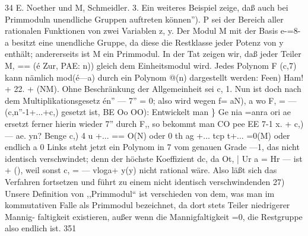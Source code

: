\documentclass[11pt,a4paper]{article}
\theoremstyle{plain}
\theoremstyle{definition}
\begin{document}
34 
E. Noether und M, Schmeidler. 
3. Ein weiteres Beispiel zeige, daß auch bei Primmoduln unendliche 
Gruppen auftreten können\textdegree{}''). P sei der Bereich aller rationalen Funktionen 
von zwei Variablen z, y. 
Der Modul M mit der Basis 
e-=8-a 
besitzt eine unendliche Gruppe, da diese die Restklasse jeder Potenz von y 
enthält; andererseits ist M ein Primmodul. 
In der Tat zeigen wir, daß 
jeder Teiler 
M, == (é Zur, PAE: n)) 
gleich dem Einheitsmodul wird. 
Jedes Polynom F (c,7) kann 
nämlich 
mod(é---a) durch ein Polynom @(n) dargestellt werden: 
Feen) Ham! + 22. + (NM). 
Ohne Beschränkung der Allgemeinheit sei c, 
1. Nun ist doch nach dem 
Multiplikationsgesetz én'' --- 7'' = 0; also wird wegen 
f= aN), 
a 
wo F, = ---(c,n''-1+...+c,) gesetzt ist, 
BE 
Oo OO): 
Entwickelt man 
\} 
Ge 
nia =anra ori ae 
ersetzt ferner hierin wieder 7'' durch F,, so bekommt man 
CO 
pee 
EE 
7-1 
x. + c,)--- ae. yn? Benge c,) 4 u 
+... == O(N) 
oder 
0 
th 
ag 
+... tcp t+... =0(M) 
oder endlich 
a 
0 
Links steht jetzt ein Polynom in 7 vom genauen Grade \guillemotright{} ---1, das 
nicht identisch verschwindet; denn der höchste Koeffizient 
dc, 
da 
Ot, | 
Ur 
a 
= 
Hr --- ist + (), 
weil sonst c, = --- vloga+ y(y) nicht rational wäre. 
Also läßt sich das 
Verfahren fortsetzen und führt zu einem nicht identisch verschwindenden 
27) Unsere Definition von ,,Primmodul`` 
ist verschieden von dem, was man im 
kommutativen Falle als Primmodul bezeichnet, da dort stets Teiler niedrigerer Mannig- 
faltigkeit existieren, außer wenn die Mannigfaltigkeit =0, die Restgruppe also endlich ist. 
351
\end{document}
